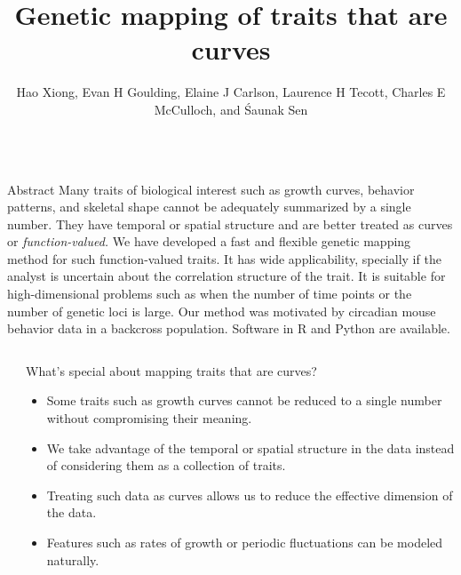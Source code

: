 \documentclass[final,plain]{beamer}
\title{Genetic mapping of traits that are curves}
\author{Hao Xiong\footnotemark[1], Evan H Goulding\footnotemark[2],
  Elaine J Carlson\footnotemark[3], Laurence H Tecott\footnotemark[3],
  Charles E McCulloch\footnotemark[1], and \'Saunak Sen\footnotemark[1]}
\institute{\footnotemark[1]{\normalsize Department of Epidemiology and
  Biostatistics, University of California, San Francisco, CA}
\footnotemark[2]{\normalsize Department of Psychiatry and Behavioral Sciences,
Northwestern University Feinberg School of Medicine, Chicago, IL}
\footnotemark[3]{\normalsize Department of Psychiatry, 
  University of California, San Francisco, CA}
}
\newlength{\sepwid}
\newlength{\onecolwid}
\newlength{\threecolwid}
\begin{document}
\begin{frame}[t]

\begin{columns}[t]
\begin{column}{\threecolwid}
\begin{exampleblock}{\sffamily \LARGE Abstract}
  {\Large Many traits of biological interest such as growth curves,
    behavior patterns, and skeletal shape cannot be adequately summarized by a
    single number. They have temporal or spatial structure and are
    better treated as curves or {\em function-valued.}  We have
    developed a fast and flexible genetic mapping method for such
    function-valued traits.  It has wide applicability, specially if
    the analyst is uncertain about the correlation structure of the
    trait.  It is suitable for high-dimensional problems such as when
    the number of time points or the number of genetic loci is large.
    Our method was motivated by circadian mouse behavior data in a
    backcross population.  Software in R and Python
    are available.  }
\end{exampleblock}
\end{column}
\end{columns}

\begin{columns}[t]								
  \begin{column}{\sepwid}\end{column}                 %
  
  \begin{column}{\onecolwid}
    
    \begin{alertblock}{What's special about mapping traits that are curves?}
      \begin{itemize}
        \item Some traits such as growth curves cannot be reduced to a
          single number without compromising their meaning.
          \item We take advantage of the temporal or spatial structure
            in the data instead of considering them as a collection of
            traits.
          \item Treating such data as curves allows us to reduce the
            effective dimension of the data.
          \item Features such as rates of growth or periodic
            fluctuations can be modeled naturally.
      \end{itemize}
    \end{alertblock}


\end{column}
\end{columns}
\end{frame}
\end{document}
